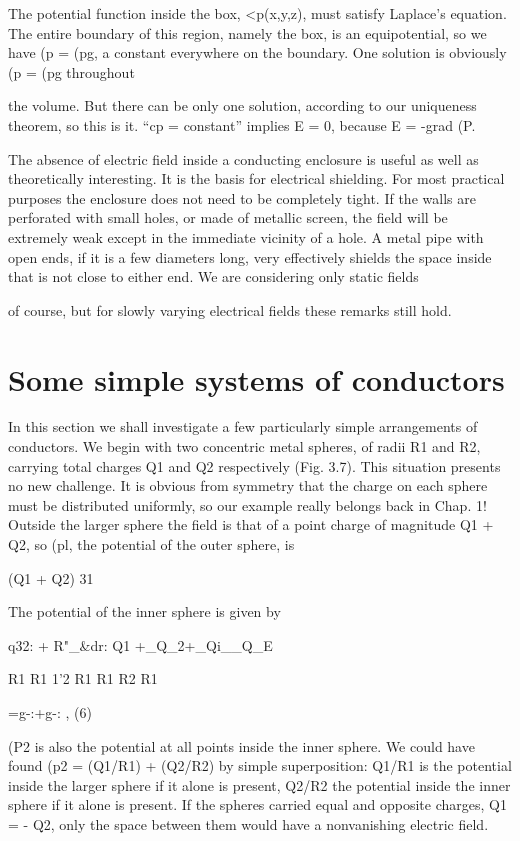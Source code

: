 The potential function inside the box, <p(x,y,z), must satisfy
Laplace's equation. The entire boundary of this region, namely the
box, is an equipotential, so we have (p = (pg, a constant everywhere
on the boundary. One solution is obviously (p = (pg throughout

the volume. But there can be only one solution, according to our
uniqueness theorem, so this is it. ``cp = constant'' implies E = 0,
because E = -grad (P.

The absence of electric field inside a conducting enclosure is useful
as well as theoretically interesting. It is the basis for electrical
shielding. For most practical purposes the enclosure does not need
to be completely tight. If the walls are perforated with small holes,
or made of metallic screen, the field will be extremely weak except
in the immediate vicinity of a hole. A metal pipe with open ends,
if it is a few diameters long, very effectively shields the space inside
that is not close to either end. We are considering only static fields

of course, but for slowly varying electrical fields these remarks still
hold.

\section{Some simple systems of conductors}

In this section we shall investigate a few particularly simple arrangements
of conductors. We begin with two concentric metal
spheres, of radii R1 and R2, carrying total charges Q1 and Q2 respectively
(Fig. 3.7). This situation presents no new challenge. It is
obvious from symmetry that the charge on each sphere must be distributed
uniformly, so our example really belongs back in Chap. 1!
Outside the larger sphere the field is that of a point charge of magnitude
Q1 + Q2, so (pl, the potential of the outer sphere, is

(Q1 + Q2)
31

The potential of the inner sphere is given by

q32: + R"_&dr: Q1 +_Q_2+_Qi__Q_E

R1 R1 1'2 R1 R1 R2 R1

=g-:+g-: , (6)

(P2 is also the potential at all points inside the inner sphere. We could
have found (p2 = (Q1/R1) + (Q2/R2) by simple superposition:
Q1/R1 is the potential inside the larger sphere if it alone is present,
Q2/R2 the potential inside the inner sphere if it alone is present. If
the spheres carried equal and opposite charges, Q1 = - Q2, only the
space between them would have a nonvanishing electric field.

